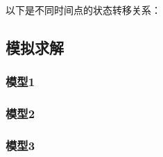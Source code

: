 \documentclass{article}
\begin{document}
以下是不同时间点的状态转移关系：

\subsection{模拟求解}

\subsubsection{模型1}

\subsubsection{模型2}

\subsubsection{模型3}
\end{document}
